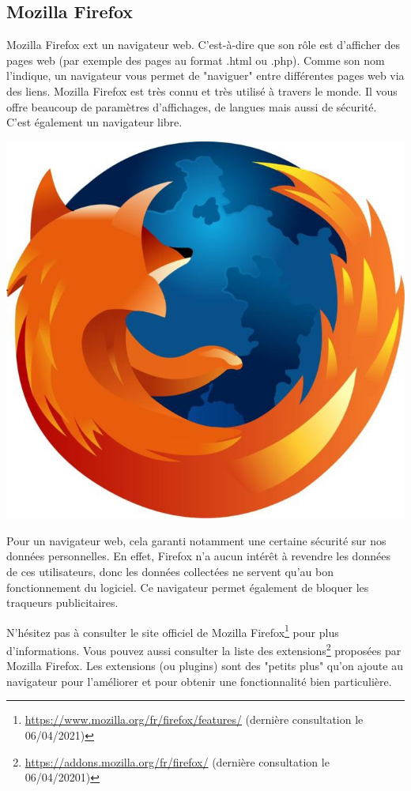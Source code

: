 \documentclass[12pt]{book}
\begin{document}
	\subsection{Mozilla Firefox}\label{sec:descfirefox}
		\hspace{-.8cm}
		\begin{minipage}[c]{.7\textwidth}\par
			\hspace{.4cm}
			Mozilla Firefox ext un navigateur web.
			C'est-à-dire que son rôle est d'afficher des pages web (par exemple des pages au format .html ou .php).
			Comme son nom l'indique, un navigateur vous permet de "naviguer" entre différentes pages web via des liens.
			Mozilla Firefox est très connu et très utilisé à travers le monde.
			Il vous offre beaucoup de paramètres d'affichages, de langues mais aussi de sécurité.
			C'est également un navigateur libre.
		\end{minipage}
		\begin{minipage}[c]{.3\textwidth}
			\centering
			\includegraphics[width=\textwidth]{include/mf_logo.jpg}
		\end{minipage}\par
		Pour un navigateur web, cela garanti notamment une certaine sécurité sur nos données personnelles.
		En effet, Firefox n'a aucun intérêt à revendre les données de ces utilisateurs, donc les données collectées ne servent qu'au bon fonctionnement du logiciel.
		Ce navigateur permet également de bloquer les traqueurs publicitaires.\par
		N'hésitez pas à consulter le site officiel de Mozilla Firefox\footnote{\href{https://www.mozilla.org/fr/firefox/features/}{https://www.mozilla.org/fr/firefox/features/} (dernière consultation le 06/04/2021)} pour plus d'informations.
		Vous pouvez aussi consulter la liste des extensions\footnote{\href{https://addons.mozilla.org/fr/firefox/}{https://addons.mozilla.org/fr/firefox/} (dernière consultation le 06/04/20201)} proposées par Mozilla Firefox.
		Les extensions (ou plugins) sont des "petits plus" qu'on ajoute au navigateur pour l'améliorer et pour obtenir une fonctionnalité bien particulière.
\end{document}
